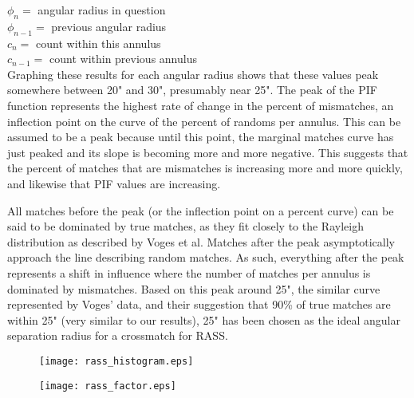 \documentclass[10pt]{article}
\begin{document}
\begin{multicols}{2}
\indent \indent \indent $\phi_n =$ angular radius in question\\
\indent \indent \indent $\phi_{n-1} =$ previous angular radius\\
\indent \indent \indent $c_n =$ count within this annulus\\
\indent \indent \indent $c_{n-1} =$ count within previous annulus\\

Graphing these results for each angular radius shows that these values peak somewhere between 20" and 30", presumably near 25". The peak of the PIF function represents the highest rate of change in the percent of mismatches, an inflection point on the curve of the percent of randoms per annulus. This can be assumed to be a peak because until this point, the marginal matches curve has just peaked and its slope is becoming more and more negative. This suggests that the percent of matches that are mismatches is increasing more and more quickly, and likewise that PIF values are increasing.

All matches before the peak (or the inflection point on a percent curve) can be said to be dominated by true matches, as they fit closely to the Rayleigh distribution as described by Voges et al. Matches after the peak asymptotically approach the line describing random matches. As such, everything after the peak represents a shift in influence where the number of matches per annulus is dominated by mismatches. Based on this peak around 25", the similar curve represented by Voges' data, and their suggestion that 90\% of true matches are within 25" (very similar to our results), 25" has been chosen as the ideal angular separation radius for a crossmatch for RASS. 

\end{multicols}
\begin{figure}[htbp] 
\hspace*{-0.55in}
\centering
\begin{minipage}{.5\textwidth}
	\centering
	\texttt{[image: rass\_histogram.eps]}
	\label{xyz} 
\end{minipage}%
\begin{minipage}{.5\textwidth}
	\centering
	\texttt{[image: rass\_factor.eps]} 
	\label{xyz} 
\end{minipage}
\label{fig:test}
\end{figure} 
\end{document}
